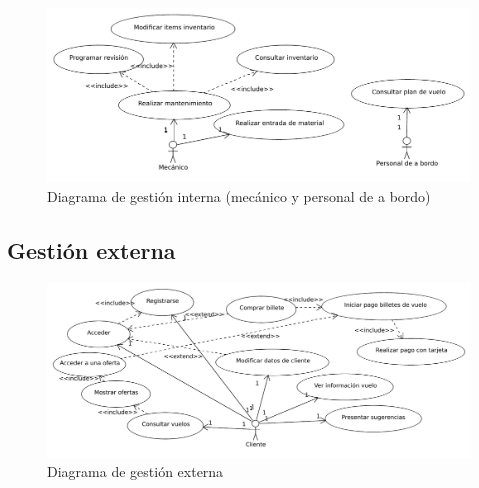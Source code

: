 \documentclass[11pt, a4paper, twoside]{report}
\begin{document}
	\begin{figure}
		\hspace*{0cm}\includegraphics[scale=.9]{diagramas/gestioninterna2.pdf}
		\caption{Diagrama de gestión interna (mecánico y personal de a bordo)}
	\end{figure}

	
	
	
	
	
	
	
	
	
	
	
	
	
	
	
	
	
	
	
	
	
	
	
	
	
	

	\subsection{Gestión externa} \vspace{.5cm}

	\begin{figure}
		\includegraphics[scale=.93]{diagramas/gestionexterna.pdf}
		\caption{Diagrama de gestión externa}
	\end{figure}

	
	
	
	
	
	
	
	
	
	
	
	
\end{document}
